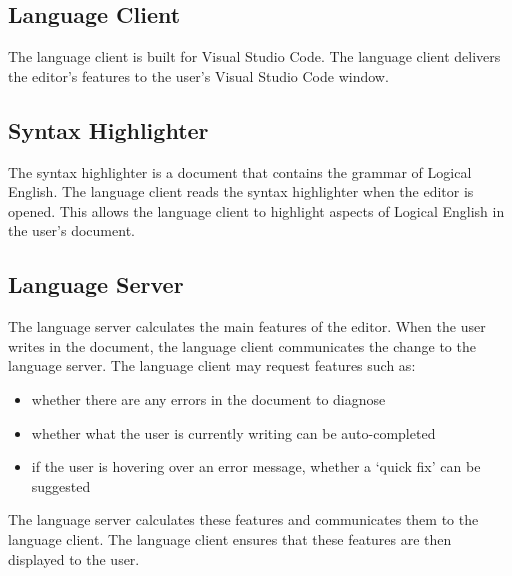 \documentclass[../main.tex]{subfiles}
\begin{document}
\subsection{Language Client}
The language client is built for Visual Studio Code. The language client delivers the editor's features to the user's Visual Studio Code window.

\subsection{Syntax Highlighter}
The syntax highlighter is a document that contains the grammar of Logical English. The language client reads the syntax highlighter when the editor is opened. This allows the language client to highlight aspects of Logical English in the user's document.

\subsection{Language Server}
The language server calculates the main features of the editor. When the user writes in the document, the language client communicates the change to the language server. The language client may request features such as:
\begin{itemize}
    \item whether there are any errors in the document to diagnose
    \item whether what the user is currently writing can be auto-completed
    \item if the user is hovering over an error message, whether a `quick fix' can be suggested
\end{itemize}
The language server calculates these features and communicates them to the language client. The language client ensures that these features are then displayed to the user.
\end{document}

